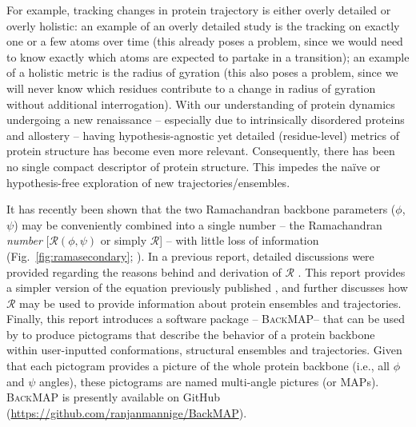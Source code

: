 \documentclass[fleqn,10pt,lineno]{wlpeerj} %
\newcommand{\Fig}[1]{Fig.~\ref{#1}}
\newcommand{\n}[1]{{\color{red}#1}}
\newcommand{\gname}{BackMAP}
\newcommand{\pname}{\textsc{\gname}\xspace}
\begin{document}
For example, tracking changes in protein trajectory is either overly detailed or overly holistic: an example of an overly detailed study is the tracking on exactly one or a few atoms over time (this already poses a problem, since we would need to know exactly which atoms are expected to partake in a transition); an example of a holistic metric is the radius of gyration (this also poses a problem, since we will never know which residues contribute to a change in radius of gyration without additional interrogation). %
With our understanding of protein dynamics undergoing a new \n{renaissance} -- especially due to intrinsically disordered proteins and allostery -- having hypothesis-agnostic yet detailed (residue-level) metrics of protein structure has become even more relevant. 
Consequently, there has been no single compact descriptor of protein structure. This impedes the na{\"i}ve or hypothesis-free exploration of new trajectories/ensembles. %

It has recently been shown that the two Ramachandran backbone parameters ($\phi$,$\psi$) may be conveniently combined into a single number -- the Ramachandran \textit{number} [$\mathcal{R}(\phi,\psi)$ or simply $\mathcal{R}$] -- with little loss of information (\Fig{fig:ramasecondary}; \cite{Mannige2016}). 
In a previous report, detailed discussions were provided regarding the reasons behind and derivation of $\mathcal{R}$ \citep{Mannige2016}. This report provides a simpler version of the equation previously published \citep{Mannige2016}, and further discusses how $\mathcal{R}$ may be used to provide information about protein ensembles and trajectories. 
Finally, this report introduces a software package -- \pname -- that can be used by to produce \n{pictograms} that describe the behavior of a protein backbone within user-inputted conformations, structural ensembles and trajectories. 
\n{Given that each pictogram provides a picture of the whole protein backbone (i.e., all $\phi$ and $\psi$ angles), these pictograms are 
named multi-angle pictures (or MAPs).} %
\pname is presently available on GitHub (\url{https://github.com/ranjanmannige/\gname}).
\end{document}
